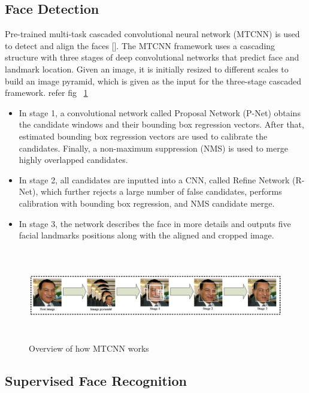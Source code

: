 \documentclass[a4paper,12pt, twoside]{NITKReport}
\begin{document}
\subsection{Face Detection}
Pre-trained  multi-task  cascaded  convolutional neural  network (MTCNN)  is used   to  detect  and  align  the  faces [\cite{zhang2014jointly}]. The MTCNN framework uses a cascading  structure  with  three  stages  of  deep  convolutional networks that predict face and landmark location. Given an image, it is initially resized to different scales to build an image pyramid, which is given as the input for the three-stage cascaded framework. refer fig ~\ref{mtcnn} 
\begin{itemize}
\item In stage 1, a convolutional network called Proposal Network (P-Net) obtains the candidate windows and their bounding box regression vectors. After that, estimated bounding box regression vectors are used to calibrate the candidates.  Finally, a non-maximum suppression  (NMS)  is  used  to  merge  highly  overlapped candidates.
\item In stage 2,  all candidates are inputted into a CNN, called Refine Network (R-Net), which further rejects a  large  number  of  false  candidates,  performs  calibration with bounding box regression, and NMS candidate merge.
\item In stage 3, the network describes the face in more details and outputs five facial landmarks positions along with the aligned and cropped image. 
\end{itemize}   
\begin{figure} [h]
\centering
    \includegraphics[height=4cm,width=15cm]{mtcnn.png}
    \caption{Overview of how MTCNN works}
    \label{mtcnn}
\end{figure}

\subsection{Supervised Face Recognition}
\end{document}
